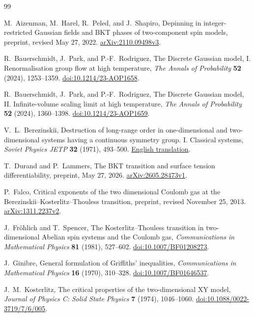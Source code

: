 \begin{thebibliography}{99}
\raggedright

M.~Aizenman, M.~Harel, R.~Peled, and J.~Shapiro,
Depinning in integer-restricted Gaussian fields and BKT phases of
two-component spin models,
preprint, revised May 27, 2022.
\href{https://arxiv.org/abs/2110.09498v3}{arXiv:2110.09498v3}.

R.~Bauerschmidt, J.~Park, and P.-F.~Rodriguez,
The Discrete Gaussian model, I. Renormalisation group flow at high temperature,
\emph{The Annals of Probability} \textbf{52} (2024), 1253--1359.
\href{https://doi.org/10.1214/23-AOP1658}{doi:10.1214/23-AOP1658}.

R.~Bauerschmidt, J.~Park, and P.-F.~Rodriguez,
The Discrete Gaussian model, II. Infinite-volume scaling limit at high temperature,
\emph{The Annals of Probability} \textbf{52} (2024), 1360--1398.
\href{https://doi.org/10.1214/23-AOP1659}{doi:10.1214/23-AOP1659}.

V.~L.~Berezinskii,
Destruction of long-range order in one-dimensional and two-dimensional
systems having a continuous symmetry group. I. Classical systems,
\emph{Soviet Physics JETP} \textbf{32} (1971), 493--500.
\href{https://www.jetp.ras.ru/cgi-bin/dn/e_032_03_0493.pdf}{English translation}.

T.~Durand and P.~Lammers,
The BKT transition and surface tension differentiability,
preprint, May 27, 2026.
\href{https://arxiv.org/abs/2605.28473v1}{arXiv:2605.28473v1}.

P.~Falco,
Critical exponents of the two dimensional Coulomb gas at the
Berezinskii--Kosterlitz--Thouless transition,
preprint, revised November 25, 2013.
\href{https://arxiv.org/abs/1311.2237v2}{arXiv:1311.2237v2}.

J.~Fr\"ohlich and T.~Spencer,
The Kosterlitz--Thouless transition in two-dimensional Abelian spin systems
and the Coulomb gas,
\emph{Communications in Mathematical Physics} \textbf{81} (1981), 527--602.
\href{https://doi.org/10.1007/BF01208273}{doi:10.1007/BF01208273}.

J.~Ginibre,
General formulation of Griffiths' inequalities,
\emph{Communications in Mathematical Physics} \textbf{16} (1970), 310--328.
\href{https://doi.org/10.1007/BF01646537}{doi:10.1007/BF01646537}.

J.~M.~Kosterlitz,
The critical properties of the two-dimensional XY model,
\emph{Journal of Physics C: Solid State Physics} \textbf{7} (1974), 1046--1060.
\href{https://doi.org/10.1088/0022-3719/7/6/005}{doi:10.1088/0022-3719/7/6/005}.


\end{thebibliography}
